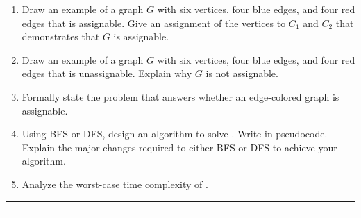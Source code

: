 \documentclass[11pt,twoside]{article}
\newcounter{problem}
\newcommand{\solution}{\bigskip\hrule\bigskip}
\newcommand{\problembreak}{\bigskip\hrule\bigskip}
\newcounter{pseudocode}
\begin{document}
{\bfseries
\begin{enumerate}

\item
Draw an example of a graph $G$ with six vertices, four blue edges,
and four red edges
that is assignable.
Give an assignment of the vertices to $C_1$ and $C_2$
that demonstrates that $G$ is assignable.

\item
Draw an example of a graph $G$ with six vertices, four blue edges,
and four red edges
that is unassignable.
Explain why $G$ is not assignable.

\item
Formally state the problem {}
that answers whether an edge-colored graph is assignable.

\item
Using BFS or DFS,
design an algorithm {}
to solve {}.
Write {} in pseudocode.
Explain the major changes
required to either BFS or DFS
to achieve your {} algorithm.

\item
Analyze the worst-case time complexity of {}.

\end{enumerate}
}

\solution


\problembreak
\end{document}
